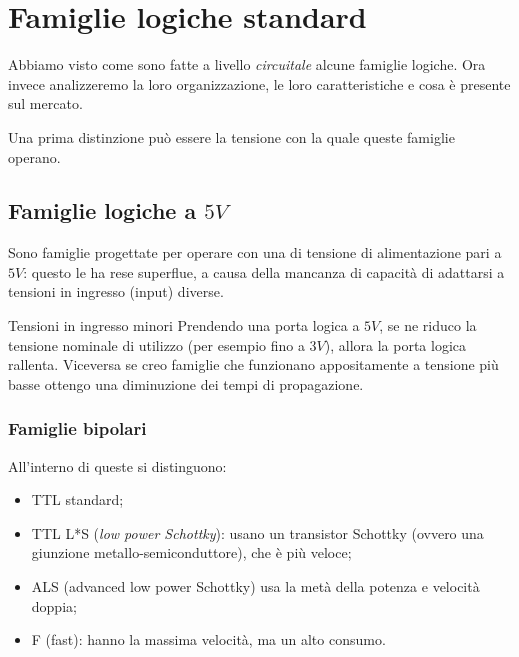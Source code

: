 \documentclass[
]{book}
\providecommand{\tightlist}{%
  \setlength{\itemsep}{0pt}\setlength{\parskip}{0pt}}
\begin{document}
\section{Famiglie logiche standard}\label{famiglie-logiche-standard}

Abbiamo visto come sono fatte a livello \emph{circuitale} alcune
famiglie logiche. Ora invece analizzeremo la loro organizzazione, le
loro caratteristiche e cosa è presente sul mercato.

Una prima distinzione può essere la tensione con la quale queste
famiglie operano.

\subsection{\texorpdfstring{Famiglie logiche a
\(5V\)}{Famiglie logiche a 5V}}\label{famiglie-logiche-a-5v}

Sono famiglie progettate per operare con una di tensione di
alimentazione pari a \(5V\): questo le ha rese superflue, a causa della
mancanza di capacità di adattarsi a tensioni in ingresso (input)
diverse.

\begin{bluebox}{Tensioni in ingresso minori}
Prendendo una porta logica a $5V$, se ne riduco la tensione nominale di utilizzo (per esempio fino a $3V$), allora la porta logica rallenta. Viceversa se creo famiglie che funzionano appositamente a tensione più basse ottengo una diminuzione dei tempi di propagazione.
\end{bluebox}

\subsubsection{Famiglie bipolari}\label{famiglie-bipolari}

All'interno di queste si distinguono:

\begin{itemize}
\tightlist
\item
  TTL standard;
\item
  TTL L*S (\emph{low power Schottky}): usano un transistor Schottky
  (ovvero una giunzione metallo-semiconduttore), che è più veloce;
\item
  ALS (advanced low power Schottky) usa la metà della potenza e velocità
  doppia;
\item
  F (fast): hanno la massima velocità, ma un alto consumo.
\end{itemize}
\end{document}
